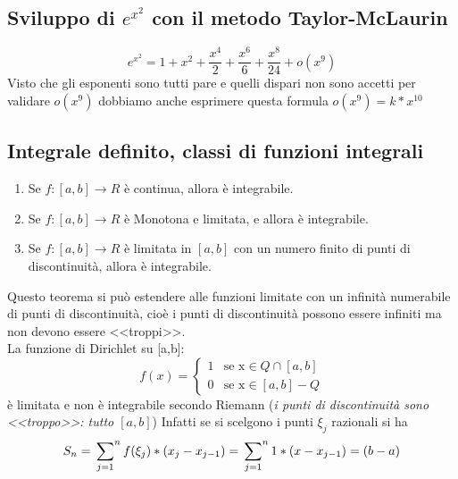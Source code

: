 \subsection{Sviluppo di $e^{x^2}$ con il metodo Taylor-McLaurin}
\begin{equation*}
	e^{x^2}=1+x^2+\frac{x^4}{2}+\frac{x^6}{6}+\frac{x^8}{24}+o(x^9)
\end{equation*}
Visto che gli esponenti sono tutti pare e quelli dispari non sono accetti per validare $o(x^9)$ dobbiamo anche esprimere questa formula $o(x^9)=k*x^{10}$

\subsection{Integrale definito, classi di funzioni integrali}
\begin{enumerate}
	\item Se $f:[a,b]\to R$ è continua, allora è integrabile.
	\item Se $f:[a,b]\to R$ è Monotona e limitata, e allora è integrabile.
	\item Se $f:[a,b]\to R$ è limitata in $[a,b]$ con un numero finito di punti di discontinuità, allora è integrabile.
\end{enumerate}
Questo teorema si può estendere alle funzioni limitate con un infinità numerabile di punti di discontinuità, cioè i punti di discontinuità possono essere infiniti ma non devono essere <<troppi>>.\\
La funzione di Dirichlet su [a,b]:
\begin{equation*}
f(x)=\begin{cases}
		1 &\text{se x}\in Q \cap [a,b]\\
		0&\text{se x}\in [a,b] -Q
	\end{cases}
\end{equation*}
è limitata e non è integrabile secondo Riemann (\textit{i punti di discontinuità sono <<troppo>>: tutto $[a,b]$}) Infatti se si scelgono i punti $\xi_j$ razionali si ha
\begin{equation*}
	S_n=\sideset{}{^n}\sum_{j=1}f(\xi_j)*(x_j-x_{j-1})=\sideset{}{^n}\sum_{j=1}1*(x-x_{j-1})=(b-a)
\end{equation*} 
